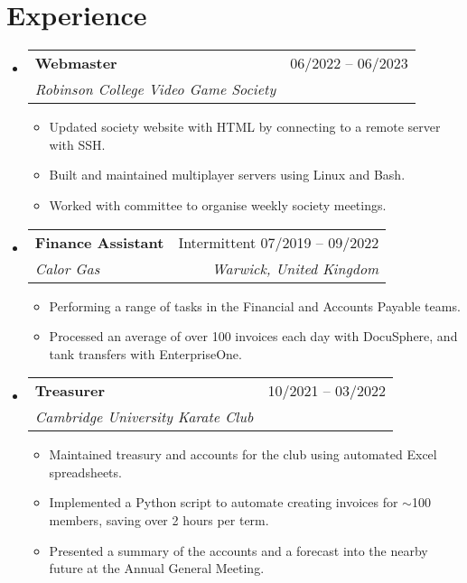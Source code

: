 \documentclass[a4paper,11pt]{article}
\makeatletter
\newcommand{\resumeItem}[1]{
  \item{
    {#1 \vspace{-4pt}}
  }
}
\newcommand{\resumeSubheading}[4]{
  \vspace{-2pt}\item
    \begin{tabular*}{0.97\textwidth}[t]{l@{\extracolsep{\fill}}r}
      \textbf{#1} & #2 \\
      \textit{\small #3} & \textit{\small #4} \\
    \end{tabular*}\vspace{-10pt}
}
\newcommand{\resumeSubHeadingListStart}{\begin{itemize}[leftmargin=0.15in, label={}]}
\newcommand{\resumeSubHeadingListEnd}{\end{itemize}}
\newcommand{\resumeItemListStart}{\begin{itemize}}
\newcommand{\resumeItemListEnd}{\end{itemize}}
\makeatother
\begin{document}
\section{Experience}
\resumeSubHeadingListStart
\resumeSubheading
        {Webmaster}{06/2022 -- 06/2023}
        {Robinson College Video Game Society}{}
    \resumeItemListStart
        \small\resumeItem{Updated society website with HTML by connecting to a remote server with SSH.}
        \resumeItem{Built and maintained multiplayer servers using Linux and Bash.}
        \resumeItem{Worked with committee to organise weekly society meetings.}
    \resumeItemListEnd
\begin{comment}
    \resumeSubheading
        {Treasurer}{June 2022 -- Present}
        {Robinson College Video Game Society}{}
    \resumeItemListStart
        \small\resumeItem{Maintained society accounts}
        \resumeItem{Run society events with the committee.}
    \resumeItemListEnd

    \resumeSubheading
        {Chairperson}{June 2022 -- Present}
        {Robinson College Board Game Society}{}
    \resumeItemListStart
        \small\resumeItem{Organised society meetings}
        \resumeItem{Created Excel spreadsheet to maintain society funds.}
    \resumeItemListEnd

    \resumeSubheading
        {Chairperson}{June 2022 -- Present}
        {Robinson College RPG Society}{}
\end{comment}
    \resumeSubheading
      {Finance Assistant}{Intermittent 07/2019 -- 09/2022}
      {Calor Gas}{Warwick, United Kingdom}
      \resumeItemListStart
        \small\resumeItem{Performing a range of tasks in the Financial and Accounts Payable teams.}
        \resumeItem{Processed an average of over 100 invoices each day with DocuSphere, and tank transfers with EnterpriseOne.}
        \resumeItemListEnd

\begin{comment}
    \resumeSubheading
        {Secretary}{June 2021 -- June 2022}
        {Robinson College Video Game Society}{}
    \resumeItemListStart
        \small\resumeItem{Minuted the society's Annual General Meeting.}
    \resumeItemListEnd
\end{comment}  
    \resumeSubheading
      {Treasurer}{10/2021 -- 03/2022}
      {Cambridge University Karate Club}{}
      \resumeItemListStart
        \small\resumeItem{Maintained treasury and accounts for the club using automated Excel spreadsheets.}
        \resumeItem{Implemented a Python script to automate creating invoices for $\sim$100 members, saving over 2 hours per term.}
        \resumeItem{Presented a summary of the accounts and a forecast into the nearby future at the Annual General Meeting.}
        \resumeItemListEnd
\begin{comment}
    \resumeSubheading
        {Crew Member}{October 2017 -- May 2020}
        {McDonald's}{Leamington Spa, United Kingdom}
    \resumeItemListStart
        \small\resumeItem{Experience working in a high-paced dynamic environment}
    \resumeItemListEnd
\end{comment}
\resumeSubHeadingListEnd
\end{document}
